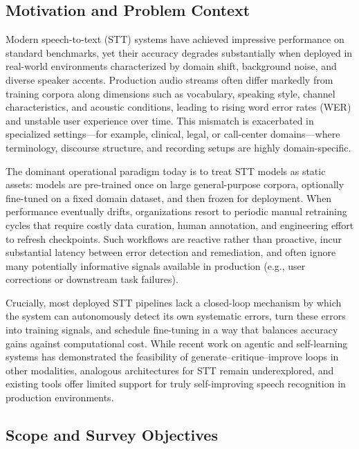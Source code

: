 \documentclass[conference]{IEEEtran}
\begin{document}
\label{sec:introduction}

\subsection{Motivation and Problem Context}

Modern speech-to-text (STT) systems have achieved impressive performance on standard benchmarks, yet their accuracy degrades substantially when deployed in real-world environments characterized by domain shift, background noise, and diverse speaker accents. Production audio streams often differ markedly from training corpora along dimensions such as vocabulary, speaking style, channel characteristics, and acoustic conditions, leading to rising word error rates (WER) and unstable user experience over time. This mismatch is exacerbated in specialized settings---for example, clinical, legal, or call-center domains---where terminology, discourse structure, and recording setups are highly domain-specific.

The dominant operational paradigm today is to treat STT models as static assets: models are pre-trained once on large general-purpose corpora, optionally fine-tuned on a fixed domain dataset, and then frozen for deployment. When performance eventually drifts, organizations resort to periodic manual retraining cycles that require costly data curation, human annotation, and engineering effort to refresh checkpoints. Such workflows are reactive rather than proactive, incur substantial latency between error detection and remediation, and often ignore many potentially informative signals available in production (e.g., user corrections or downstream task failures).

Crucially, most deployed STT pipelines lack a closed-loop mechanism by which the system can autonomously detect its own systematic errors, turn these errors into training signals, and schedule fine-tuning in a way that balances accuracy gains against computational cost. While recent work on agentic and self-learning systems has demonstrated the feasibility of generate–critique–improve loops in other modalities, analogous architectures for STT remain underexplored, and existing tools offer limited support for truly self-improving speech recognition in production environments.

\subsection{Scope and Survey Objectives}
\end{document}
